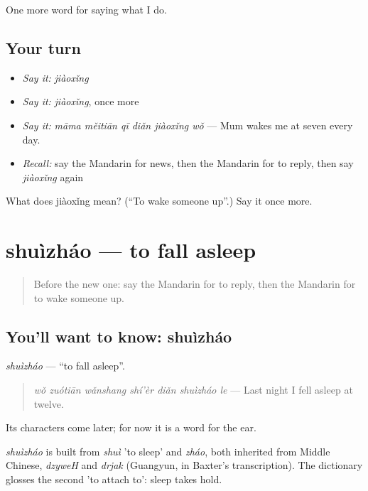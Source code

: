 \begin{grammarlens}[title={What you've built}]
One more word for saying what I do.
\end{grammarlens}

\subsection*{Your turn}
\begin{itemize}
\raggedright
  \item \emph{Say it:} \emph{jiàoxǐng}
  \item \emph{Say it:} \emph{jiàoxǐng}, once more
  \item \emph{Say it:} \emph{māma měitiān qī diǎn jiàoxǐng wǒ} — Mum wakes me at seven every day.
  \item \emph{Recall:} say the Mandarin for news, then the Mandarin for to reply, then say \emph{jiàoxǐng} again
\end{itemize}

\begin{tcolorbox}[breakable,colback=teal!4,colframe=teal!35!black,title={Before you move on}]
What does jiàoxǐng mean? (\textquotedblleft{}To wake someone up\textquotedblright{}.) Say it once more.
\end{tcolorbox}
\section[shuìzháo]{shuìzháo — to fall asleep}

\label{lesson:ZH-C158-shuizhao}



\begin{quote}
Before the new one: say the Mandarin for to reply, then the Mandarin for to wake someone up.
\end{quote}

\subsection*{You'll want to know: shuìzháo}
\emph{shuìzháo} — \textquotedblleft{}to fall asleep\textquotedblright{}.

\begin{quote}
\emph{wǒ zuótiān wǎnshang shí'èr diǎn shuìzháo le} — Last night I fell asleep at twelve.
\end{quote}

Its characters come later; for now it is a word for the ear.

\begin{cousinweb}
\emph{shuìzháo} is built from \emph{shuì} 'to sleep' and \emph{zháo}, both inherited from Middle Chinese, \emph{dzyweH} and \emph{drjak} (Guangyun, in Baxter's transcription). The dictionary glosses the second 'to attach to': sleep takes hold.
\end{cousinweb}

